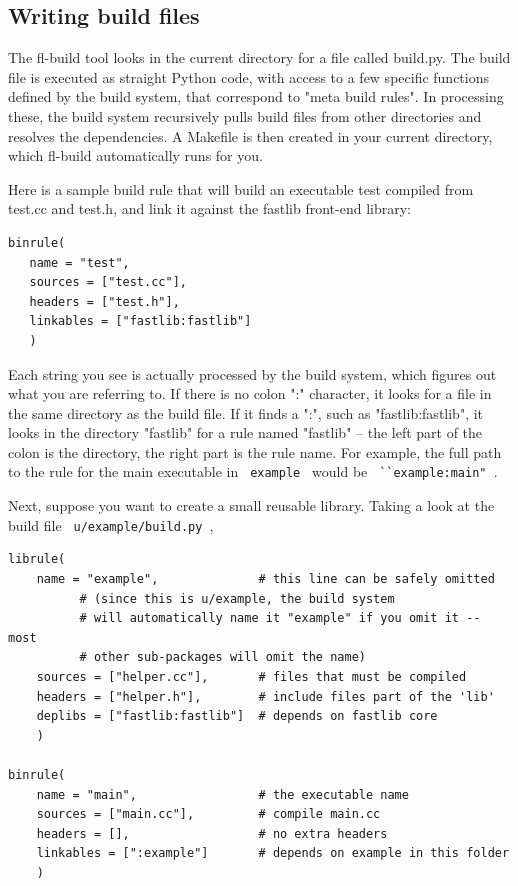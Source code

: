 \documentclass[letter]{report}
\begin{document}
\subsection{Writing build files}

The fl-build tool looks in the current directory for a file called build.py. The build file is executed as straight Python code, with access to a few specific functions defined by the build system, that correspond to "meta build rules". In processing these, the build system recursively pulls build files from other directories and resolves the dependencies. A Makefile is then created in your current directory, which fl-build automatically runs for you.

Here is a sample build rule that will build an executable test compiled from test.cc and test.h, and link it against the fastlib front-end library:
\begin{verbatim}
binrule(
   name = "test",
   sources = ["test.cc"],
   headers = ["test.h"],
   linkables = ["fastlib:fastlib"]
   )
\end{verbatim}
Each string you see is actually processed by the build system, which figures out what you are referring to. If there is no colon ":" character, it looks for a file in the same directory as the build file. If it finds a ":", such as "fastlib:fastlib", it looks in the directory "fastlib" for a rule named "fastlib" -- the left part of the colon is the directory, the right part is the rule name. For example, the full path to the rule for the main executable in \verb= example = would be \verb= ``example:main" =.

Next, suppose you want to create a small reusable library. Taking a look at the build file \verb= u/example/build.py =,
\begin{verbatim}
librule(
    name = "example",              # this line can be safely omitted
          # (since this is u/example, the build system
          # will automatically name it "example" if you omit it -- most
          # other sub-packages will omit the name)
    sources = ["helper.cc"],       # files that must be compiled
    headers = ["helper.h"],        # include files part of the 'lib'
    deplibs = ["fastlib:fastlib"]  # depends on fastlib core
    )

binrule(
    name = "main",                 # the executable name
    sources = ["main.cc"],         # compile main.cc
    headers = [],                  # no extra headers
    linkables = [":example"]       # depends on example in this folder
    )
\end{verbatim}
\end{document}
